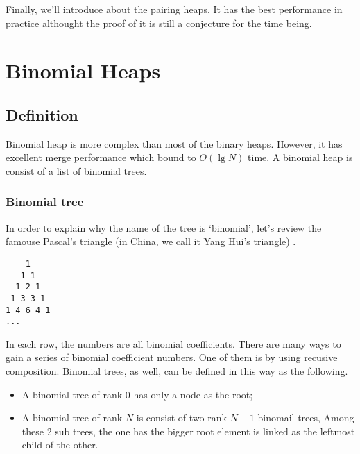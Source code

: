 \documentclass{article}
\begin{document}
Finally, we'll introduce about the pairing heaps. It has the best performance in practice althought the proof of it is still a conjecture for the time 
being.


\section{Binomial Heaps}
\label{binomail-heap} 


\subsection{Definition}

Binomial heap is more complex than most of the binary heaps. However,
it has excellent merge performance which bound to $O(\lg N)$ time. A
binomial heap is consist of a list of binomial trees.

\subsubsection{Binomial tree}
\label{Binomial tree} 

In order to explain why the name of the tree is `binomial', let's review
the famouse Pascal's triangle (in China, we call it Yang Hui's triangle)
\cite{wiki-pascal-triangle}.

\begin{verbatim}
    1
   1 1
  1 2 1
 1 3 3 1
1 4 6 4 1
...
\end{verbatim}

In each row, the numbers are all binomial coefficients. There are many
ways to gain a series of binomial coefficient numbers. One of them is
by using recusive composition. Binomial trees, as well, can be defined
in this way as the following.

\begin{itemize}
\item A binomial tree of rank 0 has only a node as the root;
\item A binomial tree of rank $N$ is consist of two rank $N-1$ binomail trees,
Among these 2 sub trees, the one has the bigger root element is linked as the
leftmost child of the other.
\end{itemize}
\end{document}
